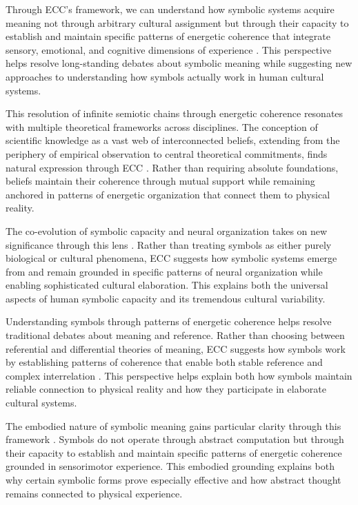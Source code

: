 \begin{refsection}
Through ECC's framework, we can understand how symbolic systems acquire meaning not through arbitrary cultural assignment but through their capacity to establish and maintain specific patterns of energetic coherence that integrate sensory, emotional, and cognitive dimensions of experience \cite{varela1991embodied}. This perspective helps resolve long-standing debates about symbolic meaning while suggesting new approaches to understanding how symbols actually work in human cultural systems.

This resolution of infinite semiotic chains through energetic coherence resonates with multiple theoretical frameworks across disciplines. The conception of scientific knowledge as a vast web of interconnected beliefs, extending from the periphery of empirical observation to central theoretical commitments, finds natural expression through ECC \cite{quine1960word}. Rather than requiring absolute foundations, beliefs maintain their coherence through mutual support while remaining anchored in patterns of energetic organization that connect them to physical reality.

The co-evolution of symbolic capacity and neural organization takes on new significance through this lens \cite{deacon1997symbolic}. Rather than treating symbols as either purely biological or cultural phenomena, ECC suggests how symbolic systems emerge from and remain grounded in specific patterns of neural organization while enabling sophisticated cultural elaboration. This explains both the universal aspects of human symbolic capacity and its tremendous cultural variability.

Understanding symbols through patterns of energetic coherence helps resolve traditional debates about meaning and reference. Rather than choosing between referential and differential theories of meaning, ECC suggests how symbols work by establishing patterns of coherence that enable both stable reference and complex interrelation \cite{searle1980minds}. This perspective helps explain both how symbols maintain reliable connection to physical reality and how they participate in elaborate cultural systems.

The embodied nature of symbolic meaning gains particular clarity through this framework \cite{hutchins1995cognition}. Symbols do not operate through abstract computation but through their capacity to establish and maintain specific patterns of energetic coherence grounded in sensorimotor experience. This embodied grounding explains both why certain symbolic forms prove especially effective and how abstract thought remains connected to physical experience.


\end{refsection}
